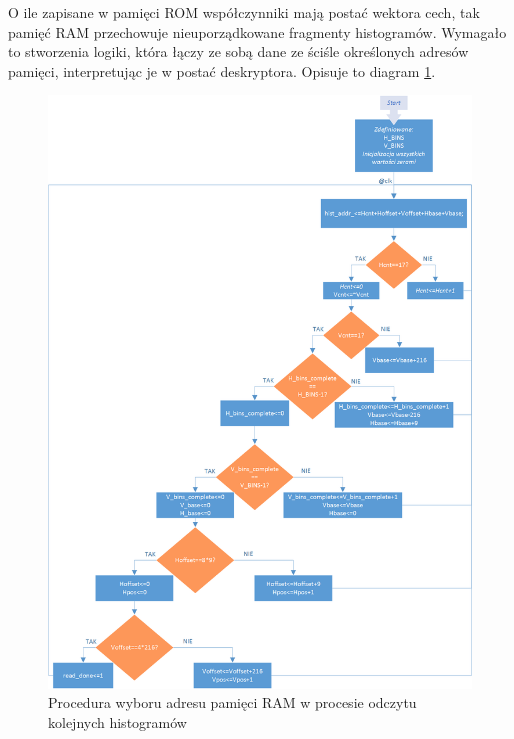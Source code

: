 O ile zapisane w pamięci ROM współczynniki mają postać wektora cech, tak pamięć RAM przechowuje nieuporządkowane fragmenty histogramów. 
Wymagało to stworzenia logiki, która łączy ze sobą dane ze ściśle określonych adresów pamięci, interpretując je w postać deskryptora.  
Opisuje to diagram \ref{fig:hog_feature_histrogram_address}. %

\begin{figure}[!ht]
	\centering
	\captionsetup{justification=centering,margin=1cm}
	\includegraphics[width=16cm]{4_HOG_Features.png}
	\caption{Procedura wyboru adresu pamięci RAM w procesie odczytu kolejnych histogramów}
	\label{fig:hog_feature_histrogram_address}
\end{figure} 

